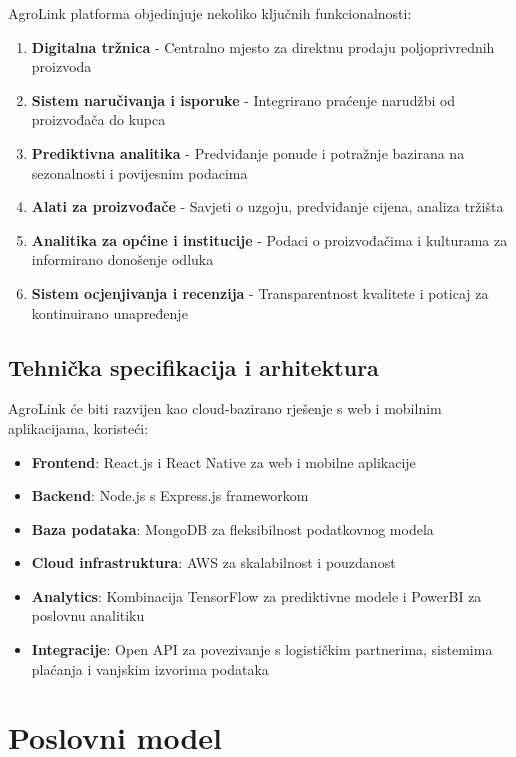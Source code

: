 \documentclass[a4paper,12pt]{article}
\begin{document}
AgroLink platforma objedinjuje nekoliko ključnih funkcionalnosti:

\begin{enumerate}
    \item \textbf{Digitalna tržnica} - Centralno mjesto za direktnu prodaju poljoprivrednih proizvoda
    \item \textbf{Sistem naručivanja i isporuke} - Integrirano praćenje narudžbi od proizvođača do kupca
    \item \textbf{Prediktivna analitika} - Predviđanje ponude i potražnje bazirana na sezonalnosti i povijesnim podacima
    \item \textbf{Alati za proizvođače} - Savjeti o uzgoju, predviđanje cijena, analiza tržišta
    \item \textbf{Analitika za općine i institucije} - Podaci o proizvođačima i kulturama za informirano donošenje odluka
    \item \textbf{Sistem ocjenjivanja i recenzija} - Transparentnost kvalitete i poticaj za kontinuirano unapređenje
\end{enumerate}

\subsection{Tehnička specifikacija i arhitektura}

AgroLink će biti razvijen kao cloud-bazirano rješenje s web i mobilnim aplikacijama, koristeći:

\begin{itemize}
    \item \textbf{Frontend}: React.js i React Native za web i mobilne aplikacije
    \item \textbf{Backend}: Node.js s Express.js frameworkom
    \item \textbf{Baza podataka}: MongoDB za fleksibilnost podatkovnog modela
    \item \textbf{Cloud infrastruktura}: AWS za skalabilnost i pouzdanost
    \item \textbf{Analytics}: Kombinacija TensorFlow za prediktivne modele i PowerBI za poslovnu analitiku
    \item \textbf{Integracije}: Open API za povezivanje s logističkim partnerima, sistemima plaćanja i vanjskim izvorima podataka
\end{itemize}

\section{Poslovni model}
\label{sec:poslovni-model}
\end{document}
